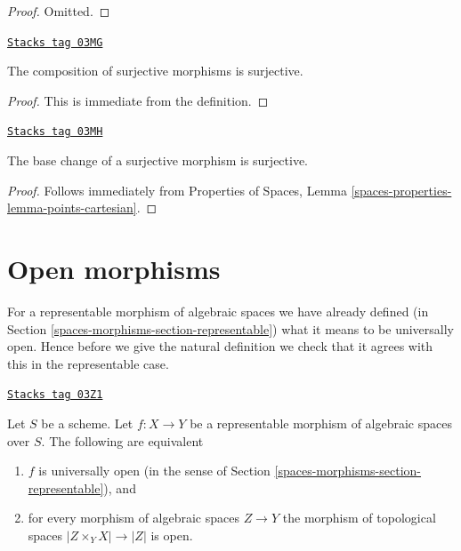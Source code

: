 \begin{proof}
Omitted.
\end{proof}

\begin{lemma}
\label{spaces-morphisms-lemma-composition-surjective}
\href{https://stacks.math.columbia.edu/tag/03MG}{\texttt{Stacks tag 03MG}}

The composition of surjective morphisms is surjective.
\end{lemma}

\begin{proof}
This is immediate from the definition.
\end{proof}

\begin{lemma}
\label{spaces-morphisms-lemma-base-change-surjective}
\href{https://stacks.math.columbia.edu/tag/03MH}{\texttt{Stacks tag 03MH}}

The base change of a surjective morphism is surjective.
\end{lemma}

\begin{proof}
Follows immediately from
Properties of Spaces, Lemma \ref{spaces-properties-lemma-points-cartesian}.
\end{proof}

\section{Open morphisms}
\label{spaces-morphisms-section-open}
For a representable morphism of algebraic spaces we have already defined (in
Section \ref{spaces-morphisms-section-representable})
what it means to be universally open. Hence before we give the natural
definition we check that it agrees with this in the representable case.

\begin{lemma}
\label{spaces-morphisms-lemma-characterize-representable-universally-open}
\href{https://stacks.math.columbia.edu/tag/03Z1}{\texttt{Stacks tag 03Z1}}

Let $S$ be a scheme. Let $f : X \to Y$ be a representable morphism of
algebraic spaces over $S$. The following are equivalent
\begin{enumerate}
\item $f$ is universally open
(in the sense of Section \ref{spaces-morphisms-section-representable}), and
\item for every morphism of algebraic spaces $Z \to Y$ the morphism of
topological spaces $|Z \times_Y X| \to |Z|$ is open.
\end{enumerate}
\end{lemma}

